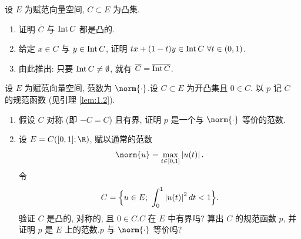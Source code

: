 \begin{exercise}
\label{exer:1.7}
设 $E$ 为赋范向量空间, $C\subset E$ 为凸集.

\begin{enumerate}[label=\arabic*., leftmargin=2.2em, itemsep=0.25em]
	\item 证明 $\overline{C}$ 与 $\operatorname{Int} C$ 都是凸的.
	\item 给定 $x\in C$ 与 $y\in\operatorname{Int} C$, 证明 $tx+(1-t)y\in\operatorname{Int} C\ \forall t\in(0,1)$.
	\item 由此推出: 只要 $\operatorname{Int} C\ne\emptyset$, 就有 $\overline{C}=\overline{\operatorname{Int} C}$.
\end{enumerate}
\end{exercise}

\begin{exercise}
\label{exer:1.8}
设 $E$ 为赋范向量空间, 范数为 $\norm{\cdot}$.设 $C\subset E$ 为开凸集且 $0\in C$.
以 $p$ 记 $C$ 的规范函数 (见引理  \ref{lem:1.2}).

\begin{enumerate}[label=\arabic*., leftmargin=2.2em, itemsep=0.25em]
	\item 假设 $C$ 对称 (即 $-C=C$) 且有界, 证明 $p$ 是一个与 $\norm{\cdot}$ 等价的范数.
	\item 设 $E=C([0,1];\R)$, 赋以通常的范数
	      \begin{equation*}
	      \norm{u}=\max_{t\in[0,1]}\abs{u(t)}.
	      \end{equation*}
	      令
	      \begin{equation*}
	      C=\Bigl\{u\in E;\ \int_0^1\abs{u(t)}^2dt<1\Bigr\}.
	      \end{equation*}
	      验证 $C$ 是凸的, 对称的, 且 $0\in C$.$C$ 在 $E$ 中有界吗? 算出 $C$ 的规范函数
	      $p$, 并证明 $p$ 是 $E$ 上的范数.$p$ 与 $\norm{\cdot}$ 等价吗?
\end{enumerate}
\end{exercise}

